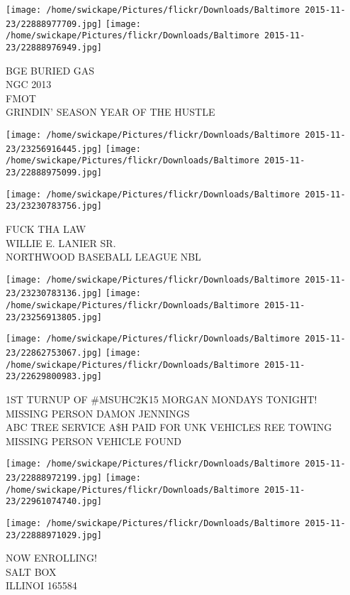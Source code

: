 \documentclass[10pt,letterpaper]{article}
\begin{document}
\texttt{[image: /home/swickape/Pictures/flickr/Downloads/Baltimore 2015-11-23/22888977709.jpg]}
\texttt{[image: /home/swickape/Pictures/flickr/Downloads/Baltimore 2015-11-23/22888976949.jpg]}

BGE BURIED GAS\\
NGC 2013\\
FMOT\\
GRINDIN' SEASON YEAR OF THE HUSTLE
\pagebreak

\texttt{[image: /home/swickape/Pictures/flickr/Downloads/Baltimore 2015-11-23/23256916445.jpg]}
\texttt{[image: /home/swickape/Pictures/flickr/Downloads/Baltimore 2015-11-23/22888975099.jpg]}

\vspace{0.25in}
\texttt{[image: /home/swickape/Pictures/flickr/Downloads/Baltimore 2015-11-23/23230783756.jpg]}

FUCK THA LAW\\
WILLIE E. LANIER SR.\\
NORTHWOOD BASEBALL LEAGUE NBL
\pagebreak

\texttt{[image: /home/swickape/Pictures/flickr/Downloads/Baltimore 2015-11-23/23230783136.jpg]}
\texttt{[image: /home/swickape/Pictures/flickr/Downloads/Baltimore 2015-11-23/23256913805.jpg]}

\texttt{[image: /home/swickape/Pictures/flickr/Downloads/Baltimore 2015-11-23/22862753067.jpg]}
\texttt{[image: /home/swickape/Pictures/flickr/Downloads/Baltimore 2015-11-23/22629800983.jpg]}

1ST TURNUP OF \#MSUHC2K15 MORGAN MONDAYS TONIGHT!\\
MISSING PERSON DAMON JENNINGS\\
ABC TREE SERVICE A\$H PAID FOR UNK VEHICLES REE TOWING\\
MISSING PERSON VEHICLE FOUND
\pagebreak

\texttt{[image: /home/swickape/Pictures/flickr/Downloads/Baltimore 2015-11-23/22888972199.jpg]}
\texttt{[image: /home/swickape/Pictures/flickr/Downloads/Baltimore 2015-11-23/22961074740.jpg]}

\texttt{[image: /home/swickape/Pictures/flickr/Downloads/Baltimore 2015-11-23/22888971029.jpg]}

NOW ENROLLING!\\
SALT BOX\\
ILLINOI 165584
\pagebreak
\end{document}
